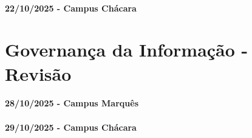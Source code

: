 \documentclass[
]{book}
\begin{document}
\subsubsection*{22/10/2025 - Campus Chácara}\label{campus-chuxe1cara-10}

\chapter{Governança da Informação - Revisão}\label{governanuxe7a-da-informauxe7uxe3o---revisuxe3o}

\subsubsection*{28/10/2025 - Campus Marquês}\label{campus-marquuxeas-11}

\subsubsection*{29/10/2025 - Campus Chácara}\label{campus-chuxe1cara-11}

  
\end{document}
